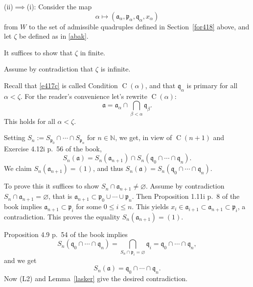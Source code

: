 \documentclass[parskip=half,fontsize=12pt]{scrartcl}%
\newcommand{\oo}{\operatorname}\newcommand{\ooo}{\operatorname*}
\newcommand{\mf}{\mathfrak}
\newcommand{\aaa}{\mf a}
\newcommand{\bbb}{\mf b}
\newcommand{\ppp}{\mf p}
\newcommand{\qqq}{\mf q}
\begin{document}
(ii)$\implies$(i): %
Consider the map 
$$
\alpha\mapsto(\aaa_\alpha,\ppp_\alpha,\qqq_\alpha,x_\alpha)
$$
from $W$ to the set of admissible quadruples defined in Section~\ref{for418} above, and let $\zeta$ be defined as in \eqref{abak}. 

It suffices to show that $\zeta$ in finite. 

Assume by contradiction that $\zeta$ is infinite.

Recall that \eqref{e417c} is called Condition $\oo C(\alpha)$, and that $\qqq_\alpha$ is primary for all $\alpha<\zeta$. For the reader's convenience let's rewrite $\oo C(\alpha)$:
$$
\aaa=\aaa_\alpha\cap\bigcap_{\beta<\alpha}\qqq_\beta.
$$ 
This holds for all $\alpha<\zeta$.

Setting $S_n:=S_{\ppp_0}\cap\cdots\cap S_{\ppp_n}$ for $n\in\mathbb N$, we get, in view of $\oo C(n+1)$ and Exercise 4.12i p.~56 of the book,
$$
S_n(\aaa)=S_n(\aaa_{n+1})\cap S_n(\qqq_0\cap\cdots\cap\qqq_n).
$$ 
We claim $S_n(\aaa_{n+1})=(1)$, and thus $S_n(\aaa)=S_n(\qqq_0\cap\cdots\cap\qqq_n)$.

To prove this it suffices to show $S_n\cap\aaa_{n+1}\ne\varnothing$. Assume by contradiction $S_n\cap\aaa_{n+1}=\varnothing$, that is $\aaa_{n+1}\subset\ppp_0\cup\cdots\cup\ppp_n$. Then Proposition 1.11i p.~8 of the book implies $\aaa_{n+1}\subset\ppp_i$ for some $0\le i\le n$. This yields $x_i\in\aaa_{i+1}\subset\aaa_{n+1}\subset\ppp_i$, a contradiction. This proves the equality $S_n(\aaa_{n+1})=(1)$.

Proposition 4.9 p.~54 of the book implies 
$$
S_n(\qqq_0\cap\cdots\cap\qqq_n)=\bigcap_{S_n\cap\ppp_i=\varnothing}\qqq_i=\qqq_0\cap\cdots\cap\qqq_n,
$$ 
and we get
$$
S_n(\aaa)=\qqq_0\cap\cdots\cap\qqq_n.
$$ 
Now (L2) and Lemma~\ref{lasker} give the desired contradiction.
\end{document}
